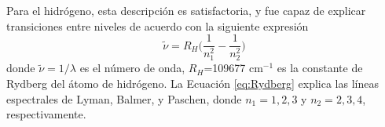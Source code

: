 \documentclass{tufte-handout}
\begin{document}
Para el hidrógeno, esta descripción es satisfactoria, y fue capaz de
explicar transiciones entre niveles de acuerdo con la siguiente 
expresión
\begin{equation}
    \tilde{\nu}=R_H\bigg(\frac{1}{n^2_1} -\frac{1}{n^2_2}\bigg) 
    \label{eq:Rydberg}
\end{equation}
donde $\tilde{\nu}=1/\lambda$ es el número de onda, $R_H$=109677 cm$^{-1}$ 
es la constante de Rydberg del átomo de hidrógeno. La Ecuación 
\ref{eq:Rydberg} explica las líneas espectrales de Lyman, Balmer, 
y Paschen, donde $n_1=1,2, 3$ y $n_2=2,3,4$, respectivamente.


%
%
%

\end{document}
